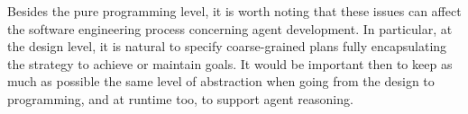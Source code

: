 %


\noindent Besides the pure programming level, it is worth noting that these
issues can affect the %
software engineering process concerning
agent development.
In particular, at the design level, it is natural to specify
coarse-grained plans fully encapsulating the strategy to achieve or
maintain goals.
%
It would be important then to keep as much as possible the same level
of abstraction when going from the design to programming, and at
runtime too, to support agent reasoning.


%
%


